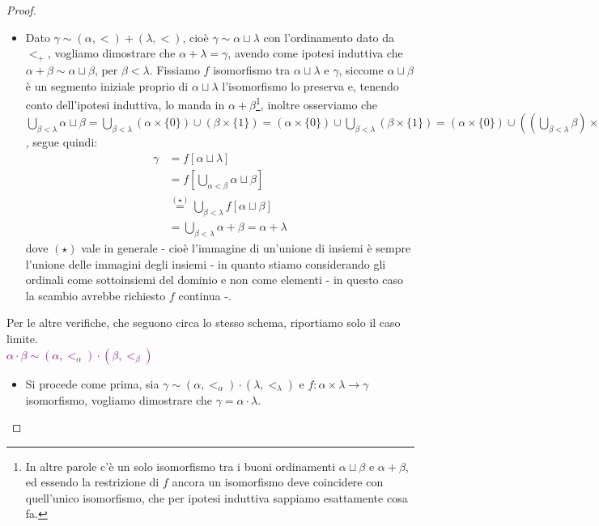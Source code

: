\begin{proof}
\begin{itemize}
		monotonia è rispettata e quindi $\widetilde{f}$ è un isomorfismo.
		\item[$\boxed{\text{$\beta = \lambda$ limite}}$] Dato $\gamma \sim (\alpha,<) + (\lambda,<)$, cioè $\gamma \sim \alpha \sqcup \lambda$ con l'ordinamento dato da $<_+$, vogliamo dimostrare che $\alpha + \lambda = \gamma$, avendo come ipotesi induttiva che $\alpha + \beta \sim \alpha \sqcup \beta$, per $\beta < \lambda$.
		Fissiamo $f$ isomorfismo tra $\alpha \sqcup \lambda$ e $\gamma$, siccome $\alpha \sqcup \beta$ è un segmento iniziale proprio di $\alpha \sqcup \lambda$ l'isomorfismo lo preserva e, tenendo conto dell'ipotesi induttiva, lo manda in $\alpha + \beta$\footnote{In altre parole c'è un solo isomorfismo tra i buoni ordinamenti $\alpha \sqcup \beta$ e $\alpha + \beta$, ed essendo la restrizione di $f$ ancora un isomorfismo deve coincidere 
		con quell'unico isomorfismo, che per ipotesi induttiva sappiamo esattamente cosa fa.}, inoltre osserviamo che $\bigcup_{\beta < \lambda} \alpha \sqcup \beta = \bigcup_{\beta < \lambda} (\alpha \times \{0\}) \cup (\beta \times \{1\}) = (\alpha \times \{0\}) \cup \bigcup_{\beta < \lambda} (\beta \times \{1\}) = (\alpha \times \{0\}) \cup \left(\left(\bigcup_{\beta < \lambda} \beta \right) \times \{1\}\right) = (\alpha \times \{0\}) \cup (\lambda \times \{1\}) = \alpha \sqcup \lambda$,
		segue quindi:
		\begin{align*}
			\gamma &= f[\alpha \sqcup \lambda] \\
				   &= f\left[\bigcup_{\alpha < \beta} \alpha \sqcup \beta\right] \\
				   &\overset{(\star)}{=} \bigcup_{\beta < \lambda} f[\alpha \sqcup \beta] \\
				   &= \bigcup_{\beta < \lambda} \alpha + \beta = \alpha + \lambda
		\end{align*}
		dove $(\star)$ vale in generale - cioè l'immagine di un'unione di insiemi è sempre l'unione delle immagini degli insiemi - in quanto stiamo considerando gli ordinali come sottoinsiemi del dominio e non come elementi - in questo caso la scambio avrebbe richiesto $f$ continua -.
	\end{itemize}
	Per le altre verifiche, che seguono circa lo stesso schema, riportiamo solo il caso limite.\\
	\textcolor{purple}{$\alpha \cdot \beta \sim (\alpha,<_\alpha) \cdot (\beta,<_\beta)$}
	\begin{itemize}
		\item[$\boxed{\text{$\beta = \lambda$ limite}}$] Si procede come prima, sia $\gamma \sim (\alpha,<_\alpha) \cdot (\lambda,<_\lambda)$ e $f : \alpha \times \lambda \rightarrow \gamma$ isomorfismo, vogliamo dimostrare che $\gamma = \alpha \cdot \lambda$.

\end{itemize}
\end{proof}

